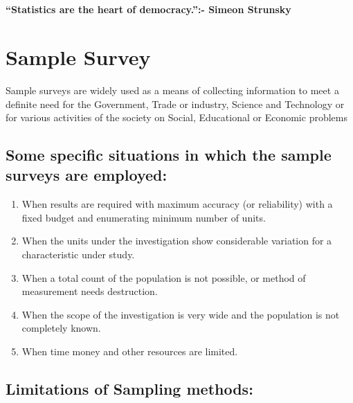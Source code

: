 \documentclass[
]{book}
\providecommand{\tightlist}{%
  \setlength{\itemsep}{0pt}\setlength{\parskip}{0pt}}
\begin{document}
~\\
\hspace*{0.333em}\\
\hspace*{0.333em}

\hypertarget{hello}{}
\textbf{``Statistics are the heart of democracy.'':- Simeon Strunsky}

\hypertarget{sample-survey}{%
\chapter{Sample Survey}\label{sample-survey}}

Sample surveys are widely used as a means of collecting information to meet a definite need for the Government, Trade or industry, Science and Technology or for various activities of the society on Social, Educational or Economic problems

\hypertarget{some-specific-situations-in-which-the-sample-surveys-are-employed}{%
\section{Some specific situations in which the sample surveys are employed:}\label{some-specific-situations-in-which-the-sample-surveys-are-employed}}

\begin{enumerate}
\def\labelenumi{\arabic{enumi}.}
\tightlist
\item
  When results are required with maximum accuracy (or reliability) with a fixed budget and enumerating minimum number of units.
\item
  When the units under the investigation show considerable variation for a characteristic under study.
\item
  When a total count of the population is not possible, or method of measurement needs destruction.
\item
  When the scope of the investigation is very wide and the population is not completely known.
\item
  When time money and other resources are limited.
\end{enumerate}

\hypertarget{limitations-of-sampling-methods}{%
\section{Limitations of Sampling methods:}\label{limitations-of-sampling-methods}}
\end{document}

